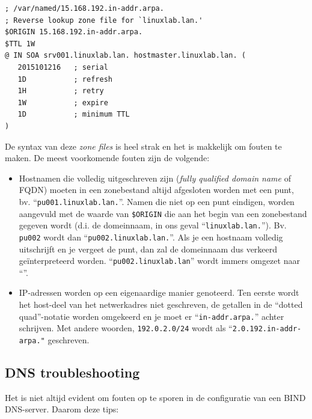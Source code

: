 \begin{verbatim}
; /var/named/15.168.192.in-addr.arpa.
; Reverse lookup zone file for `linuxlab.lan.'
$ORIGIN 15.168.192.in-addr.arpa.
$TTL 1W
@ IN SOA srv001.linuxlab.lan. hostmaster.linuxlab.lan. (
   2015101216   ; serial
   1D           ; refresh
   1H           ; retry
   1W           ; expire
   1D           ; minimum TTL
)
\end{verbatim}

De syntax van deze \emph{zone files} is heel strak en het is makkelijk om fouten te maken. De meest voorkomende fouten zijn de volgende:

\begin{itemize}
  \item Hostnamen die volledig uitgeschreven zijn (\emph{fully qualified domain name} of FQDN) moeten in een zonebestand altijd afgesloten worden met een punt, bv. ``\texttt{pu001.linuxlab.lan.}''. Namen die niet op een punt eindigen, worden aangevuld met de waarde van \texttt{\$ORIGIN} die aan het begin van een zonebestand gegeven wordt (d.i. de domeinnaam, in ons geval ``\texttt{linuxlab.lan.}''). Bv.  \texttt{pu002} wordt dan ``\texttt{pu002.linuxlab.lan.}''. Als je een hostnaam volledig uitschrijft en je vergeet de punt, dan zal de domeinnaam dus verkeerd geïnterpreteerd worden. ``\texttt{pu002.linuxlab.lan}'' wordt immers omgezet naar ``''.
  
  \item IP-adressen worden op een eigenaardige manier genoteerd. Ten eerste wordt het host-deel van het netwerkadres niet geschreven, de getallen in de ``dotted quad''-notatie worden omgekeerd en je moet er ``\texttt{in-addr.arpa.}'' achter schrijven. Met andere woorden, \texttt{192.0.2.0/24} wordt als ``\texttt{2.0.192.in-addr-arpa."} geschreven.
\end{itemize}

\subsection{DNS troubleshooting}
\label{ssec:dns-troubleshooting}

Het is niet altijd evident om fouten op te sporen in de configuratie van een BIND DNS-server. Daarom deze tips:

